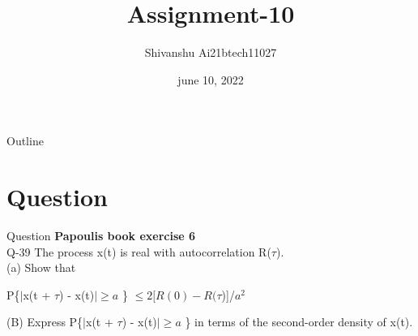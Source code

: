 \documentclass[15pt]{beamer}
\title{Assignment-10}
\author{Shivanshu  Ai21btech11027}
\date{june 10, 2022}
\begin{document}
\begin{frame}
    \titlepage 
\end{frame}

\begin{frame}{Outline}
    \tableofcontents
\end{frame}

    \section{Question}
    \begin{frame}{Question}
        \textbf{Papoulis book exercise 6}\\
        \large \noindent Q-39 The process x(t) is real with autocorrelation R($\tau$).\\
        (a) Show that \\
        \begin{center}
             P\{$|$x(t + $\tau$) - x(t)$| \geq a$ \} $\leq 2[R(0) - R(\tau$)]/$a^2$
        \end{center}
        (B) Express P\{$|$x(t + $\tau$) - x(t)$| \geq a$ \} in terms of the second-order density of x(t).\\
    \end{frame}
\end{document}
